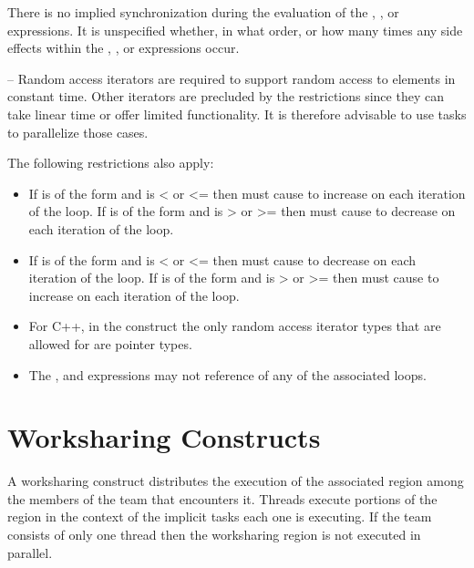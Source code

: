 There is no implied synchronization during the evaluation of the , , or  
expressions. It is unspecified whether, in what order, or how many times any side effects 
within the , , or  expressions occur.

\notestart
\noteheader – Random access iterators are required to support random access to elements in 
constant time. Other iterators are precluded by the restrictions since they can take linear 
time or offer limited functionality. It is therefore advisable to use tasks to parallelize 
those cases. 


\noteend

\restrictions
The following restrictions also apply:

\begin{itemize}
\item If  is of the form   
 and  is < or <= then  must cause  to increase on each 
iteration of the loop. If  is of 
the form    and  
is > or >= then  must cause  to decrease on each iteration of the loop.

\item If  is of the form   
 and  is < or <= then 
 must cause  to decrease on each iteration of the loop. If  is of 
the form    and  
is > or >= then  must cause  to increase on each iteration of the loop.

\item For C++, in the  construct the only random access iterator types that are 
allowed for  are pointer types.

\item The ,  and  expressions may not reference
 of any of the associated loops.
\end{itemize}
\ccppspecificend










\section{Worksharing Constructs}
\label{sec:Worksharing Constructs}
A worksharing construct distributes the execution of the associated region among the 
members of the team that encounters it. Threads execute portions of the region in the 
context of the implicit tasks each one is executing. If the team consists of only one 
thread then the worksharing region is not executed in parallel.

